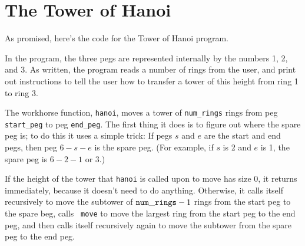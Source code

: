 %
%
%

\section{The Tower of Hanoi}

\label{hanoi-code}
As promised, here's the code for the Tower of Hanoi program.

In the program, the three pegs are represented internally by the
numbers 1, 2, and 3.  As written, the program reads a number of rings
from the user, and print out instructions to tell the user how to
transfer a tower of this height from ring 1 to ring 3.  

The workhorse function, {\tt hanoi}, moves a tower of {\tt num\_rings}
rings from peg {\tt start\_peg} to peg {\tt end\_peg}.  The first thing
it does is to figure out where the spare peg is; to do this it uses a
simple trick: If pegs $s$ and $e$ are the start and end pegs, then peg
$6-s-e$ is the spare peg.  (For example, if $s$ is 2 and $e$ is 1, the
spare peg is $6-2-1$ or $3$.)

If the height of the tower that {\tt hanoi} is called upon to move has
size 0, it returns immediately, because it doesn't need to do anything.
Otherwise, it calls itself recursively to move the subtower of ${\tt
num\_rings} - 1$ rings from the start peg to the spare beg, calls {\tt
move} to move the largest ring from the start peg to the end peg, and
then calls itself recursively again to move the subtower from the spare
peg to the end peg.

\begin{flushleft}
\verb%void%
\\* \verb%  hanoi(int num_rings,%
\\* \verb%        int start_peg, %
\\* \verb%        int end_peg)%
\\* \verb%{%
\\* \verb%  int spare_peg = 6 - start_peg - end_peg;%

\verb%  if (num_rings > 0) {%
\\* \verb%    hanoi(num_rings - 1, start_peg, spare_peg);%
\\* \verb%    move(num_rings, start_peg, end_peg);%
\\* \verb%    hanoi(num_rings - 1, spare_peg, end_peg);%
\\* \verb%  }%

\verb%  return;%
\\* \verb%}%
\end{flushleft}

